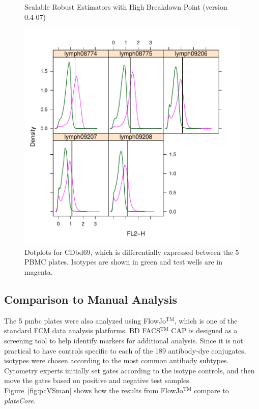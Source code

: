 \documentclass[12pt]{article}
\newcommand{\Rpackage}[1]{{\textit{#1}}}
\begin{document}
\begin{figure}
\centering
\begin{Schunk}
\begin{Soutput}
Scalable Robust Estimators with High Breakdown Point (version 0.4-07)
\end{Soutput}
\end{Schunk}
\includegraphics{outline-pbmcCDbd69}
\caption{Dotplots for CDbd69, which is differentially expressed between the 5 PBMC plates. Isotypes are shown in green and
test wells are in magenta.}
\label{fig:pbmcCDbd69}
\end{figure}

\clearpage
\subsection*{Comparison to Manual Analysis}

The 5 pmbc plates were also analyzed using FlowJo$^{\text{TM}}$, which is one of the standard FCM data analysis platforms.
BD FACS$^{\text{TM}}$ CAP is designed as a screening tool to help identify markers for additional analysis. Since it is 
not practical to have controls specific to each of the 189 antibody-dye conjugates, isotypes were chosen according to the
most common antibody subtypes. Cytometry experts initially set gates according to the isotype controls, and then move the
gates based on positive and negative test samples. Figure~\ref{fig:pcVSman} shows how the results from FlowJo$^{\text{TM}}$ compare to \Rpackage{plateCore}.
\end{document}
